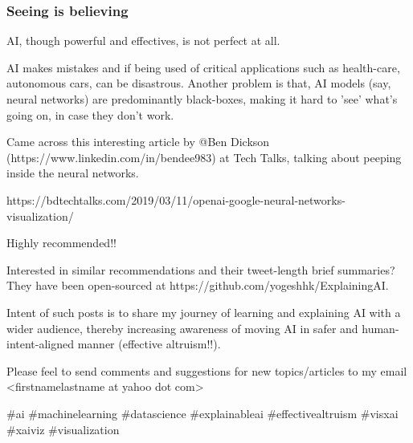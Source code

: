 \begin{frame}[fragile]\frametitle{Seeing is believing}
AI, though powerful and effectives, is not perfect at all. 

AI makes mistakes and if being used of critical applications such as health-care, autonomous cars, can be disastrous. Another problem is that, AI models (say, neural networks) are predominantly black-boxes, making it hard to 'see' what's going on, in case they don't work.


Came across this interesting article by @Ben Dickson (https://www.linkedin.com/in/bendee983) at Tech Talks, talking about peeping inside the neural networks.

https://bdtechtalks.com/2019/03/11/openai-google-neural-networks-visualization/

Highly recommended!!

Interested in similar recommendations and their tweet-length brief summaries? They have been open-sourced at https://github.com/yogeshhk/ExplainingAI. 

Intent of such posts is to share my journey of learning and explaining AI with a wider audience, thereby increasing awareness of moving AI in safer and human-intent-aligned manner (effective altruism!!).

Please feel to send comments and suggestions for new topics/articles to my email <firstnamelastname at yahoo dot com>


\#ai \#machinelearning \#datascience \#explainableai \#effectivealtruism \#visxai \#xaiviz \#visualization 
\end{frame}


